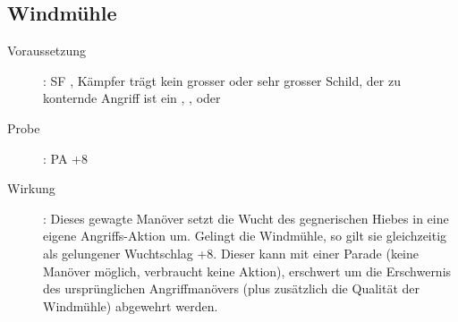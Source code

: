 \subsection{Windmühle}
\label{reaktion.windmuehle}
\begin{description}
    \item[Voraussetzung]:
        SF , Kämpfer trägt kein grosser oder sehr grosser Schild, der zu konternde Angriff ist ein , ,  oder 
    \item[Probe]:
        PA +8
    \item[Wirkung]:
        Dieses gewagte Manöver setzt die Wucht des gegnerischen Hiebes in eine eigene Angriffs-Aktion um.
        Gelingt die Windmühle, so gilt sie gleichzeitig als gelungener Wuchtschlag +8.
        Dieser kann mit einer Parade (keine Manöver möglich, verbraucht keine Aktion), erschwert um die Erschwernis des ursprünglichen Angriffmanövers (plus zusätzlich die Qualität der Windmühle) abgewehrt werden.
\end{description}
